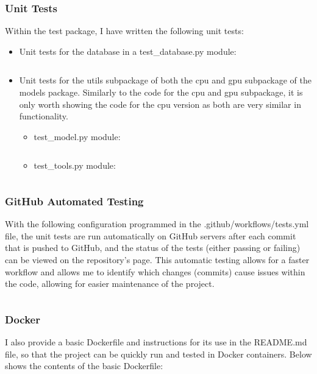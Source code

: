\documentclass[./project-report/src/latex/project-report.tex]{subfiles}
\begin{document}
\subsubsection{Unit Tests}

Within the test package, I have written the following unit tests:

\begin{itemize}
    \label{sec:database-unit-tests}
    \item Unit tests for the database in a test\_database.py module:
        \inputminted{python}{./school_project/test/test_database.py}
    
    \label{sec:models-utils-unit-tests}
    \item Unit tests for the utils subpackage of both the cpu and gpu subpackage of the models package. Similarly to the code for the cpu and gpu subpackage, it is 
          only worth showing the code for the cpu version as both are very similar in functionality.
        \begin{itemize}
            \item test\_model.py module:
                \inputminted{python}{./school_project/test/models/cpu/utils/test_model.py}

                \pagebreak

            \item test\_tools.py module:
                \inputminted{python}{./school_project/test/models/cpu/utils/test_tools.py}
        \end{itemize}
\end{itemize}

\subsubsection{GitHub Automated Testing}

With the following configuration programmed in the .github/workflows/tests.yml file, the unit tests are run automatically on GitHub servers after each commit that is pushed to GitHub, 
and the status of the tests (either passing or failing) can be viewed on the repository's page. This automatic testing allows for a faster workflow and allows me to identify which changes 
(commits) cause issues within the code, allowing for easier maintenance of the project.

\inputminted{yaml}{./.github/workflows/tests.yml}

\subsubsection{Docker}

I also provide a basic Dockerfile and instructions for its use in the README.md file, so that the project can be quickly run and tested in Docker containers. Below 
shows the contents of the basic Dockerfile:

\inputminted{docker}{./Dockerfile}
\end{document}
